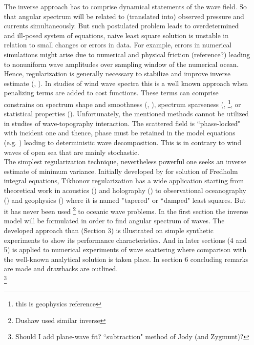 The inverse approach has to comprise dynamical statements of the wave field. So that angular spectrum will be related to (translated into) observed pressure and currents simultaneously. But such postulated problem leads to overdetermined and ill-posed system of equations, naive least square solution is unstable in relation to small changes or errors in data. For example, errors in numerical simulations might arise due to numerical and physical friction (reference?) leading to nonuniform wave amplitudes over sampling window of the numerical ocean. Hence, regularization is generally necessary to stabilize and improve inverse estimate (\cite{munk2009ocean}, \cite{snieder1999inverse}). In studies of wind wave spectra this is a well known approach when penalizing terms are added to cost functions. These terms can comprise constrains on spectrum shape and smoothness (\cite{long1979variational}, \cite{herbers1990estimation}), spectrum sparseness (\cite{hashimoto1989directional}, \cite{sacchi1996estimation}\footnote{this is geophysics reference}, or statistical properties (\cite{benoit1997analysing}). Unfortunately, the mentioned methods cannot be utilized in studies of wave-topography interaction. The scattered field is ``phase-locked" with incident one and thence, phase must be retained in the model equations (e.g. \cite{thomson2005reflection}) leading to deterministic wave decomposition. This is in contrary to wind waves of open sea that are mainly stochastic.\\

The simplest regularization technique, nevertheless powerful one seeks an inverse estimate of minimum variance. Initially developed by \cite{tikhonov2013numerical} for solution of Fredholm integral equations, Tikhonov regularization has a wide application starting from theoretical work in acoustics (\cite{colton1996simple}) and holography (\cite{williams2001regularization}) to observational oceanography (\cite{munk2009ocean}) and geophysics (\cite{snieder1999inverse}) where it is named ''tapered" or ``damped" least squares. But it has never been used \footnote{Dushaw used similar inverse} to oceanic wave problems. In the first section the inverse model will be formulated in order to find angular spectrum of waves. The developed approach than (Section 3) is illustrated on simple synthetic experiments to show its performance characteristics. And in later sections (4 and 5) is applied to numerical experiments of wave scattering where comparison with the well-known analytical solution is taken place. In section 6 concluding remarks are made and drawbacks are outlined.\\
\footnote{Should I add plane-wave fit? ``subtraction" method of Jody (and Zygmunt)?}
~\\

